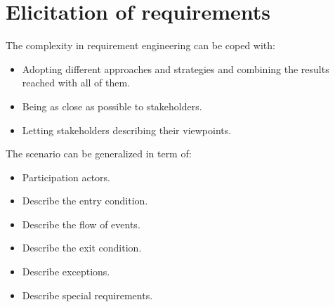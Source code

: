 \documentclass[12pt, a4paper]{report}
\newtheorem[style=M,bodystyle=\normalfont]{theorem}{Theorem}
\newtheorem[style=M,bodystyle=\normalfont]{corollary}{Corollary}
\newtheorem[style=M,bodystyle=\normalfont]{lemma}{Lemma}
\newtheorem[style=M,bodystyle=\normalfont]{definition}{Definition}
\begin{document}
\section{Elicitation of requirements}
    The complexity in requirement engineering can be coped with:
    \begin{itemize}
        \item Adopting different approaches and strategies and combining the results reached with all of them.
        \item Being as close as possible to stakeholders.
        \item Letting stakeholders describing their viewpoints.
    \end{itemize}
    The scenario can be generalized in term of:
    \begin{itemize}
        \item Participation actors.
        \item Describe the entry condition.
        \item Describe the flow of events.
        \item Describe the exit condition.
        \item Describe exceptions.
        \item Describe special requirements.
    \end{itemize}
\end{document}
